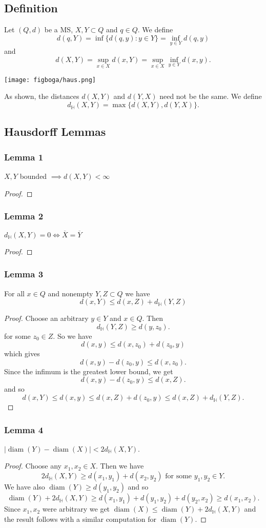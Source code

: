 \documentclass{article}
\DeclareMathOperator\HH{\mathbb{H}}
\DeclareMathOperator\diam{diam}
\begin{document}
\subsection*{Definition}
Let $(Q,d)$ be a MS, $X,Y \subset Q$ and $q \in Q$. We define $$
d(q,Y) = \inf \{d(q,y):y \in Y \} = \inf_{y \in Y} d(q,y)
$$
and $$
d(X,Y) = \sup_{x \in X} d(x,Y) = \sup_{x \in X} \inf_{y \in Y} d(x,y).
$$
\begin{center}
\texttt{[image: figboga/haus.png]}
\end{center}
As shown, the distances $d(X,Y)$ and $d(Y,X)$ need not be the same. We define $$
d_{\HH}(X,Y) = \max \{d(X,Y),d(Y,X) \}.
$$
\subsection*{Hausdorff Lemmas}
\subsubsection*{Lemma 1}
$X,Y$ bounded $\implies d(X,Y) < \infty$
\begin{proof}
\end{proof}
\subsubsection*{Lemma 2}
$d_{\HH}(X,Y) = 0 \iff \overline{X} = \overline{Y}$
\begin{proof}
\end{proof}
\subsubsection*{Lemma 3}
For all $x \in Q$ and nonempty $Y,Z \subset Q$ we have $$
d(x,Y) \leq d(x,Z) + d_{\HH}(Y,Z)
$$
\begin{proof}
Choose an arbitrary $y \in Y$ and $x \in Q$. Then $$
d_{\HH}(Y,Z) \geq d(y,z_0).
$$
for some $z_0 \in Z$.
So we have $$
d(x,y) \leq d(x,z_0)+d(z_0,y)
$$
which gives $$
d(x,y) - d(z_0,y) \leq  d(x,z_0).
$$
Since the infimum is the greatest lower bound, we get $$
d(x,y) - d(z_0,y) \leq d(x,Z).
$$
and so $$
d(x,Y) \leq d(x,y) \leq d(x,Z) + d(z_0,y) \leq d(x,Z) + d_{\HH}(Y,Z).
$$
\end{proof}
\subsubsection*{Lemma 4}
$|\diam(Y)-\diam(X)| < 2 d_{\HH}(X,Y)$.
\begin{proof}
Choose any $x_1,x_2 \in X$. Then we have $$
2d_{\HH}(X,Y) \geq d(x_1,y_1) + d(x_2,y_2) \text{ for some $y_1,y_2 \in Y$}.
$$
We have also $\diam(Y) \geq d(y_1,y_2)$
and so $$
\diam(Y) + 2d_{\HH}(X,Y) \geq d(x_1,y_1) + d(y_1,y_2) + d(y_2,x_2) \geq d(x_1,x_2).
$$
Since $x_1,x_2$ were
arbitrary we get $\diam(X) \leq \diam(Y) + 2d_{\HH}(X,Y)$
and the result follows with a similar computation for $\diam(Y)$.
\end{proof}
\end{document}
